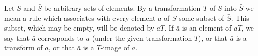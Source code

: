 Let $S$ and $\bar{S}$ be arbitrary sets of elements. By a transformation $T$ of $S$ into $\bar{S}$ we mean a rule which associates with every element $a$ of $S$ some subset of $\bar{S}$. This subset, which may be empty, will be denoted by $aT$. If $\bar{a}$ is an element of $aT$, we say that $\bar{a}$ corresponds to $a$ (under the given transformation $T$), or that $\bar{a}$ is a transform of $a$, or that $\bar{a}$ is a $T$-image of $a$.
